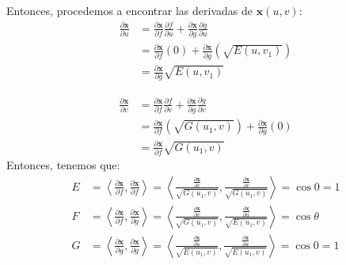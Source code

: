 \begin{problema}
\begin{enumerate}
\begin{dem}
            Entonces, procedemos a encontrar las derivadas de $\mathbf{x}(u,v)$:
            \begin{align*}
                \frac{\partial \mathbf{x}}{\partial u} &= \frac{\partial \mathbf{x}}{\partial f} \frac{\partial f}{\partial u} + \frac{\partial \mathbf{x}}{\partial g} \frac{\partial g}{\partial u}\\
                &= \frac{\partial \mathbf{x}}{\partial f} \left(0\right) + \frac{\partial \mathbf{x}}{\partial g} \left(\sqrt{E(u,v_1)}\right)\\
                &= \frac{\partial \mathbf{x}}{\partial g} \sqrt{E(u,v_1)}
            \end{align*}

            \begin{align*}
                \frac{\partial \mathbf{x}}{\partial v} &= \frac{\partial \mathbf{x}}{\partial f} \frac{\partial f}{\partial v} + \frac{\partial \mathbf{x}}{\partial g} \frac{\partial g}{\partial v}\\
                &= \frac{\partial \mathbf{x}}{\partial f} \left(\sqrt{G(u_1,v)}\right)  + \frac{\partial \mathbf{x}}{\partial g} \left(0\right)\\
                &= \frac{\partial \mathbf{x}}{\partial f} \sqrt{G(u_1,v)} 
            \end{align*}
            Entonces, tenemos que: 
            \begin{align*}
                E &= \left\langle \frac{\partial \mathbf{x}}{\partial f}, \frac{\partial \mathbf{x}}{\partial f} \right\rangle = \left\langle   \frac{\frac{\partial \mathbf{x}}{\partial v}}{\sqrt{G(u_1,v)}},\frac{\frac{\partial \mathbf{x}}{\partial v}}{\sqrt{G(u_1,v)}}\right\rangle  =  \cos 0 =1\\
                 F &= \left\langle \frac{\partial \mathbf{x}}{\partial f}, \frac{\partial \mathbf{x}}{\partial g} \right\rangle = \left\langle   \frac{\frac{\partial \mathbf{x}}{\partial v}}{\sqrt{G(u_1,v)}},\frac{\frac{\partial \mathbf{x}}{\partial u}}{\sqrt{E(u_1,v)}}\right\rangle  =\cos \theta \\
             G &= \left\langle \frac{\partial \mathbf{x}}{\partial g}, \frac{\partial \mathbf{x}}{\partial g} \right\rangle = \left\langle \frac{\frac{\partial \mathbf{x}}{\partial u}}{\sqrt{E(u_1,v)}}, \frac{\frac{\partial \mathbf{x}}{\partial u}}{\sqrt{E(u_1,v)}} \right\rangle  =\cos 0 = 1
            \end{align*}
        \end{dem}
    \end{enumerate}


\end{problema}

